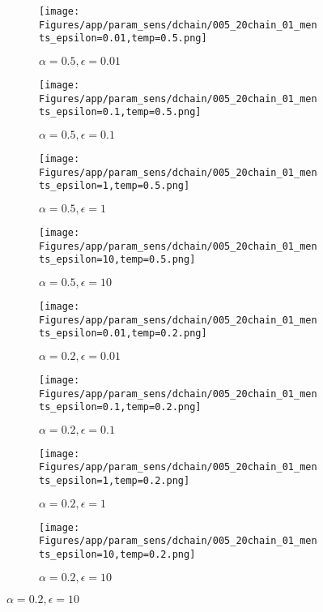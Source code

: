 \documentclass{article}
\theoremstyle{plain}
\begin{document}
\begin{appendices}
\begin{figure}
                \begin{subfigure}[b]{0.24\textwidth}
                    \centering
                    \texttt{[image: Figures/app/param\_sens/dchain/005\_20chain\_01\_ments\_epsilon=0.01,temp=0.5.png]}
                    \caption*{$\alpha=0.5,\epsilon=0.01$}
                \end{subfigure}
                \begin{subfigure}[b]{0.24\textwidth}
                    \centering
                    \texttt{[image: Figures/app/param\_sens/dchain/005\_20chain\_01\_ments\_epsilon=0.1,temp=0.5.png]}
                    \caption*{$\alpha=0.5,\epsilon=0.1$}
                \end{subfigure}
                \begin{subfigure}[b]{0.24\textwidth}
                    \centering
                    \texttt{[image: Figures/app/param\_sens/dchain/005\_20chain\_01\_ments\_epsilon=1,temp=0.5.png]}
                    \caption*{$\alpha=0.5,\epsilon=1$}
                \end{subfigure}
                \begin{subfigure}[b]{0.24\textwidth}
                    \centering
                    \texttt{[image: Figures/app/param\_sens/dchain/005\_20chain\_01\_ments\_epsilon=10,temp=0.5.png]}
                    \caption*{$\alpha=0.5,\epsilon=10$}
                \end{subfigure}
                
                \begin{subfigure}[b]{0.24\textwidth}
                    \centering
                    \texttt{[image: Figures/app/param\_sens/dchain/005\_20chain\_01\_ments\_epsilon=0.01,temp=0.2.png]}
                    \caption*{$\alpha=0.2,\epsilon=0.01$}
                \end{subfigure}
                \begin{subfigure}[b]{0.24\textwidth}
                    \centering
                    \texttt{[image: Figures/app/param\_sens/dchain/005\_20chain\_01\_ments\_epsilon=0.1,temp=0.2.png]}
                    \caption*{$\alpha=0.2,\epsilon=0.1$}
                \end{subfigure}
                \begin{subfigure}[b]{0.24\textwidth}
                    \centering
                    \texttt{[image: Figures/app/param\_sens/dchain/005\_20chain\_01\_ments\_epsilon=1,temp=0.2.png]}
                    \caption*{$\alpha=0.2,\epsilon=1$}
                \end{subfigure}
                \begin{subfigure}[b]{0.24\textwidth}
                    \centering
                    \texttt{[image: Figures/app/param\_sens/dchain/005\_20chain\_01\_ments\_epsilon=10,temp=0.2.png]}
                    \caption*{$\alpha=0.2,\epsilon=10$}
                \end{subfigure}
                

\end{figure}
\end{appendices}
\end{document}
